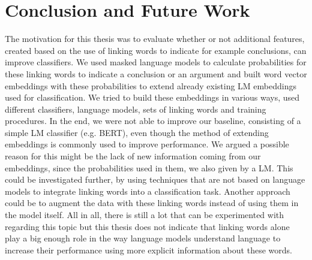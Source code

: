 \section{Conclusion and Future Work}
The motivation for this thesis was to evaluate whether or not additional features, created based on the use of linking words to indicate for example conclusions, can improve classifiers. We used masked language models to calculate probabilities for these linking words to indicate a conclusion or an argument and built word vector embeddings with these probabilities to extend already existing LM embeddings used for classification. We tried to build these embeddings in various ways, used different classifiers, language models, sets of linking words and training procedures. In the end, we were not able to improve our baseline, consisting of a simple LM classifier (e.g. BERT), even though the method of extending embeddings is commonly used to improve performance. We argued a possible reason for this might be the lack of new information coming from our embeddings, since the probabilities used in them, we also given by a LM. This could be investigated further, by using techniques that are not based on language models to integrate linking words into a classification task. Another approach could be to augment the data with these linking words instead of using them in the model itself. All in all, there is still a lot that can be experimented with regarding this topic but this thesis does not indicate that linking words alone play a big enough role in the way language models understand language to increase their performance using more explicit information about these words.